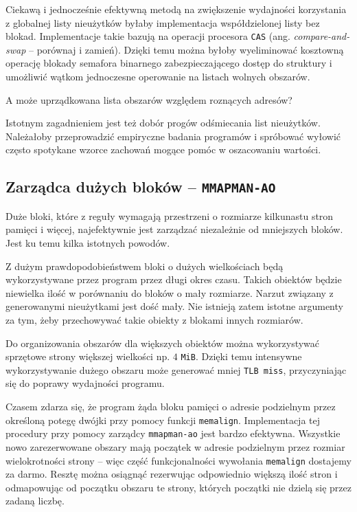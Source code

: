 \documentclass[12pt,a4paper,titlepage,twoside]{mwart}
\begin{document}
Ciekawą i jednocześnie efektywną metodą na zwiększenie wydajności korzystania z
globalnej listy nieużytków byłaby implementacja współdzielonej listy bez
blokad. Implementacje takie bazują na operacji procesora \verb+CAS+ (ang.
\textit{compare-and-swap} -- porównaj i zamień). Dzięki temu można byłoby
wyeliminować kosztowną operację blokady semafora binarnego zabezpieczającego
dostęp do struktury i umożliwić wątkom jednoczesne operowanie na listach
wolnych obszarów.

A może uprządkowana lista obszarów względem roznących adresów?

Istotnym zagadnieniem jest też dobór progów odśmiecania list nieużytków.
Należałoby przeprowadzić empiryczne badania programów i spróbować wyłowić
często spotykane wzorce zachowań mogące pomóc w oszacowaniu wartości.

\newpage

\subsection{Zarządca dużych bloków -- \texttt{MMAPMAN-AO}}

Duże bloki, które z reguły wymagają przestrzeni o rozmiarze kilkunastu stron
pamięci i więcej, najefektywnie jest zarządzać niezależnie od mniejszych
bloków. Jest ku temu kilka istotnych powodów.

Z dużym prawdopodobieństwem bloki o dużych wielkościach będą wykorzystywane
przez program przez długi okres czasu. Takich obiektów będzie niewielka ilość w
porównaniu do bloków o mały rozmiarze. Narzut związany z generowanymi
nieużytkami jest dość mały. Nie istnieją zatem istotne argumenty za tym, żeby
przechowywać takie obiekty z blokami innych rozmiarów.

Do organizowania obszarów dla większych obiektów można wykorzystywać sprzętowe
strony większej wielkości np. $4$ \verb+MiB+. Dzięki temu intensywne
wykorzystywanie dużego obszaru może generować mniej \texttt{TLB miss},
przyczyniając się do poprawy wydajności programu.

Czasem zdarza się, że program żąda bloku pamięci o adresie podzielnym przez
określoną potegę dwójki przy pomocy funkcji \verb+memalign+. Implementacja tej
procedury przy pomocy zarządcy \texttt{mmapman-ao} jest bardzo efektywna.
Wszystkie nowo zarezerwowane obszary mają początek w adresie podzielnym przez
rozmiar wielokrotności strony -- więc część funkcjonalności wywołania
\verb+memalign+ dostajemy za darmo. Resztę można osiągnąć rezerwując
odpowiednio większą ilość stron i odmapowując od początku obszaru te strony,
których początki nie dzielą się przez zadaną liczbę.
\end{document}
